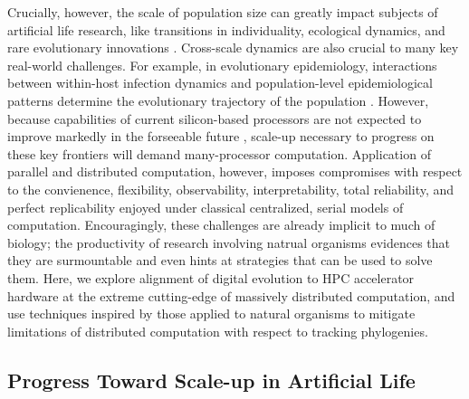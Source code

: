 Crucially, however, the scale of population size can greatly impact subjects of artificial life research, like transitions in individuality, ecological dynamics, and rare evolutionary innovations \citep{taylor2016open,dolson2021digital,taylor2019evolutionary}.
Cross-scale dynamics are also crucial to many key real-world challenges.
For example, in evolutionary epidemiology, interactions between within-host infection dynamics and population-level epidemiological patterns determine the evolutionary trajectory of the population \citep{schreiber2021cross}.
However, because capabilities of current silicon-based processors are not expected to improve markedly in the forseeable future \citep{sutter2005free}, scale-up necessary to progress on these key frontiers will demand many-processor computation.
Application of parallel and distributed computation, however, imposes compromises with respect to the convienence, flexibility, observability, interpretability, total reliability, and perfect replicability enjoyed under classical centralized, serial models of computation.
Encouragingly, these challenges are already implicit to much of biology; the productivity of research involving natrual organisms evidences that they are surmountable and even hints at strategies that can be used to solve them.
Here, we explore alignment of digital evolution to HPC accelerator hardware at the extreme cutting-edge of massively distributed computation, and use techniques inspired by those applied to natural organisms to mitigate limitations of distributed computation with respect to tracking phylogenies.

\subsection{Progress Toward Scale-up in Artificial Life}

